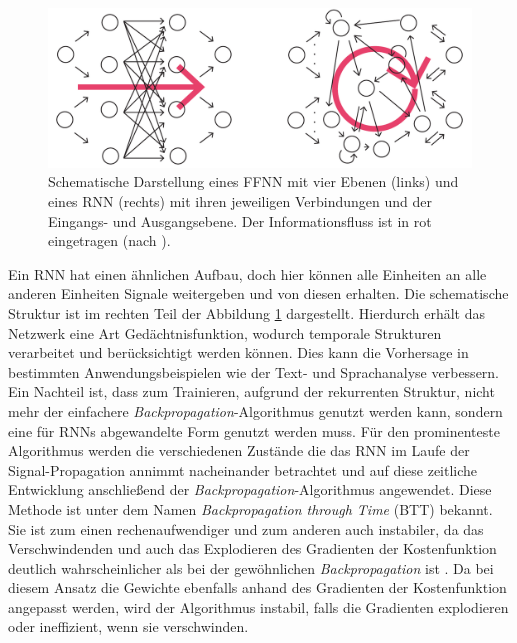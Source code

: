 \begin{figure}[H]
    \centering
    \includegraphics[width = 0.9 \textwidth]{figures/illustrations/ffnn_rnn_structure.pdf}
    \caption{Schematische Darstellung eines \textsc{FFNN} mit vier Ebenen (links) und eines \textsc{RNN} (rechts) mit ihren jeweiligen Verbindungen und der Eingangs- und Ausgangsebene. Der Informationsfluss ist in rot eingetragen (nach \citep{jeagerTut2002}).}
    \label{fig:ffnn_rnn_structure}
\end{figure}

Ein \textsc{RNN} hat einen ähnlichen Aufbau, doch hier können alle Einheiten an alle anderen Einheiten Signale weitergeben und von diesen erhalten. Die schematische Struktur ist im rechten Teil der Abbildung \ref{fig:ffnn_rnn_structure} dargestellt. Hierdurch erhält das Netzwerk eine Art Gedächtnisfunktion, wodurch temporale Strukturen verarbeitet und berücksichtigt werden können. Dies kann die Vorhersage in bestimmten Anwendungsbeispielen wie der Text- und Sprachanalyse verbessern.\\
Ein Nachteil ist, dass zum Trainieren, aufgrund der rekurrenten Struktur, nicht mehr der einfachere \textit{Backpropagation}-Algorithmus genutzt werden kann, sondern eine für \textsc{RNN}s abgewandelte Form genutzt werden muss. Für den prominenteste Algorithmus werden die verschiedenen Zustände die das \textsc{RNN} im Laufe der Signal-Propagation annimmt nacheinander betrachtet und auf diese zeitliche Entwicklung anschließend der \textit{Backpropagation}-Algorithmus angewendet. Diese Methode ist unter dem Namen \textit{Backpropagation through Time} (BTT) bekannt. Sie ist zum einen rechenaufwendiger und zum anderen auch instabiler, da das Verschwindenden und auch das Explodieren des Gradienten der Kostenfunktion deutlich wahrscheinlicher als bei der gewöhnlichen \textit{Backpropagation} ist \citep{pascanu, jeagerTut2002}. Da bei diesem Ansatz die Gewichte ebenfalls anhand des Gradienten der Kostenfunktion angepasst werden, wird der Algorithmus instabil, falls die Gradienten explodieren oder ineffizient, wenn sie verschwinden.
